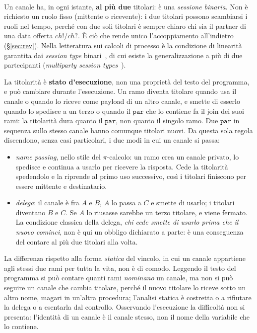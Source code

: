 \paragraph{} Un canale ha,
in ogni istante, \textbf{al più due} titolari: è una \emph{sessione binaria}.
Non è richiesto un ruolo fisso (mittente o ricevente): i due titolari possono
scambiarsi i ruoli nel tempo, perché con due soli titolari è sempre chiaro chi
sia il partner di una data offerta $\mathit{ch}!$/$\mathit{ch}?$. È ciò che
rende unico l'accoppiamento all'indietro (\S\ref{sec:rev}). Nella letteratura
sui calcoli di processo è la condizione di linearità garantita dai \emph{session
type} binari~\cite{HondaVasconcelosKubo1998}, di cui esiste la generalizzazione
a più di due partecipanti (\emph{multiparty session
types}~\cite{HondaYoshidaCarbone2008}).

\medskip
\noindent
La titolarità è \textbf{stato d'esecuzione}, non una proprietà del testo del
programma, e può cambiare durante l'esecuzione. Un ramo diventa titolare quando
usa il canale o quando lo riceve come payload di un altro canale, e smette di
esserlo quando lo spedisce a un terzo o quando il $\mathtt{par}$ che lo
contiene fa il join dei suoi rami: la titolarità dura quanto il $\mathtt{par}$,
non quanto il singolo ramo. Due $\mathtt{par}$ in sequenza sullo stesso canale
hanno comunque titolari nuovi. Da questa sola regola discendono, senza
casi particolari, i due modi in cui un canale si passa:

\begin{itemize}
\item \emph{name passing}, nello stile del $\pi$-calcolo: un ramo crea un canale
privato, lo spedisce e continua a usarlo per ricevere la risposta. Cede la
titolarità spedendolo e la riprende al primo uso successivo, così i titolari
finiscono per essere mittente e destinatario.
\item \emph{delega}: il canale è fra $A$ e $B$, $A$ lo passa a $C$ e smette di
usarlo; i titolari diventano $B$ e $C$. Se $A$ lo riusasse sarebbe un terzo
titolare, e viene fermato. La condizione classica della delega, \emph{chi cede
smette di usarlo prima che il nuovo cominci}, non è qui un obbligo dichiarato a
parte: è una conseguenza del contare al più due titolari alla volta.
\end{itemize}

\noindent
La differenza rispetto alla forma \emph{statica} del vincolo, in cui un canale
appartiene agli stessi due rami per tutta la vita, non è di comodo. Leggendo il
testo del programma si può contare quanti rami \emph{nominano} un canale, ma non
si può seguire un canale che cambia titolare, perché il nuovo titolare lo riceve
sotto un altro nome, magari in un'altra procedura; l'analisi statica è costretta
o a rifiutare la delega o a esentarla dal controllo. Osservando l'esecuzione la
difficoltà non si presenta: l'identità di un canale è il canale stesso, non il
nome della variabile che lo contiene.

